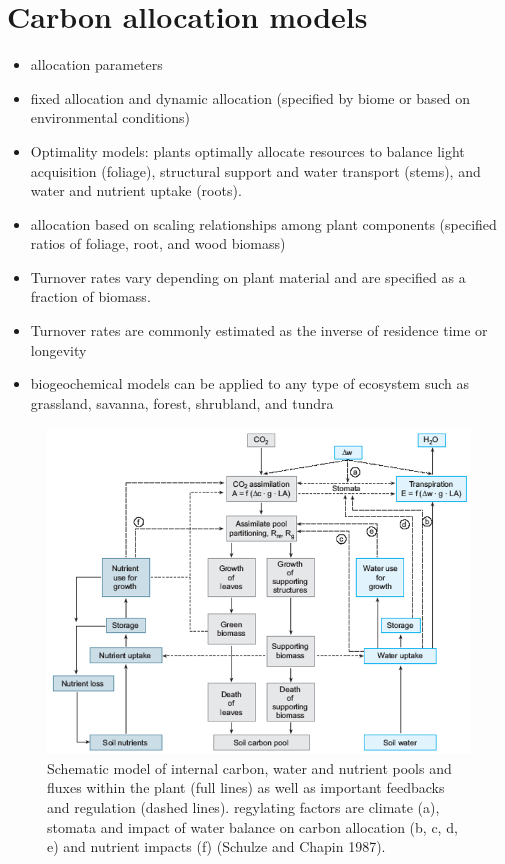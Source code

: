 \documentclass[
  12pt,
  oneside]{book}
\begin{document}
\hypertarget{carbon-allocation-models}{%
\section{Carbon allocation models}\label{carbon-allocation-models}}

\begin{itemize}
\item
  allocation parameters
\item
  fixed allocation and dynamic allocation (specified by biome or based on environmental conditions)
\item
  Optimality models: plants optimally allocate resources to balance light acquisition (foliage), structural support and water transport (stems), and water and nutrient uptake (roots).
\item
  allocation based on scaling relationships among plant components (specified ratios of foliage, root, and wood biomass)
\item
  Turnover rates vary depending on plant material and are specified as a fraction of biomass.
\item
  Turnover rates are commonly estimated as the inverse of residence time or longevity
\item
  biogeochemical models can be applied to any type of ecosystem such as grassland, savanna, forest, shrubland, and tundra
\end{itemize}

\begin{figure}

{\centering \includegraphics[width=0.8\linewidth]{figures/chap5/f57_schulze_alloc} 

}

\caption{Schematic model of internal carbon, water and nutrient pools and fluxes within the plant (full lines) as well as important feedbacks and regulation (dashed lines). regylating factors are climate (a), stomata and impact of water balance on carbon allocation (b, c, d, e) and nutrient impacts (f) (Schulze and Chapin 1987).}\label{fig:f57}
\end{figure}
\end{document}
